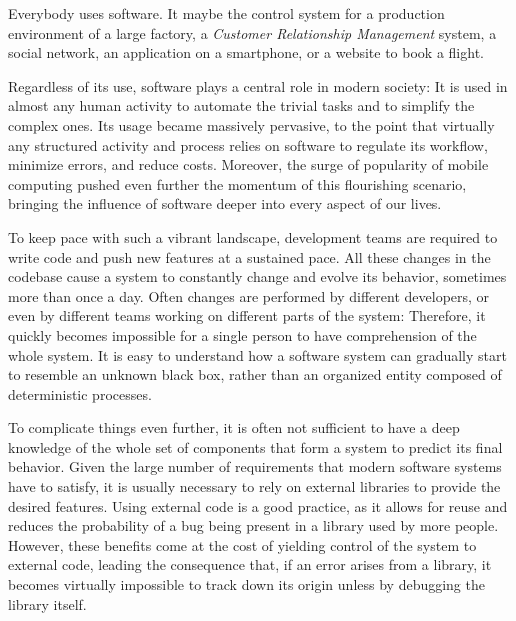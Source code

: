 

Everybody uses software.
It maybe the control system for a production environment of a large factory, a \emph{Customer Relationship Management} system, a social network, an application on a smartphone, or a website to book a flight.

Regardless of its use, software plays a central role in modern society: It is used in almost any human activity to automate the trivial tasks and to simplify the complex ones.
Its usage became massively pervasive, to the point that virtually any structured activity and process relies on software to regulate its workflow, minimize errors, and reduce costs.
Moreover, the surge of popularity of mobile computing pushed even further the momentum of this flourishing scenario, bringing the influence of software deeper into every aspect of our lives.

To keep pace with such a vibrant landscape, development teams are required to write code and push new features at a sustained pace.
All these changes in the codebase cause a system to constantly change and evolve its behavior, sometimes more than once a day.
Often changes are performed by different developers, or even by different teams working on different parts of the system: Therefore, it quickly becomes impossible for a single person to have comprehension of the whole system.
It is easy to understand how a software system can gradually start to resemble an unknown black box, rather than an organized entity composed of deterministic processes.

To complicate things even further, it is often not sufficient to have a deep knowledge of the whole set of components that form a system to predict its final behavior.
Given the large number of requirements that modern software systems have to satisfy, it is usually necessary to rely on external libraries to provide the desired features.
Using external code is a good practice, as it allows for reuse and reduces the probability of a bug being present in a library used by more people.
However, these benefits come at the cost of yielding control of the system to external code, leading the consequence that, if an error arises from a library, it becomes virtually impossible to track down its origin unless by debugging the library itself.

